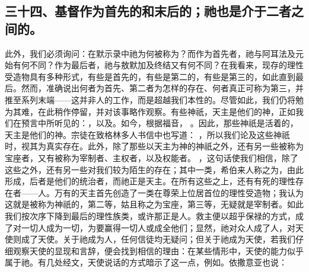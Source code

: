 
\subsection{三十四、基督作为首先的和末后的；祂也是介于二者之间的。}

此外，我们必须询问：在默示录中祂为何被称为？而作为首先者，祂与阿耳法及元始有何不同？作为最后者，祂与敖默加及终结又有何不同？在我看来，现存的理性受造物具有多种形式，有些是首先的，有些是第二的，有些是第三的，如此直到最后。然而，准确说出何者为首先、第二者为怎样的存在、何者真正可称为第三，并推至系列末端——这并非人的工作，而是超越我们本性的。尽管如此，我们仍将勉为其难，在此稍作停留，并对该事略作观察。有些神祇，天主是他们的神，正如我们在预言中所听见的：，以及。如今，根据福音， 。因此，那些神祇是活着的，天主是他们的神。宗徒在致格林多人书信中也写道： ，所以我们论及这些神祇时，视其为真实存在。此外，除了那些以天主为神的神祇之外，还有另一些被称为宝座者，又有被称为宰制者、主权者，以及权能者。 ，这句话使我们相信，除了这些之外，还有另一些对我们较为陌生的存在；其中一类，希伯来人称之为，由此形成，后者是他们的统治者，而祂正是天主。在所有这些之上，还有有死的理性存在者——人。万有的天主首先创造了一类在尊荣上位居首位的理性受造物；我认为这就是被称为神祇的，第二等，姑且称之为宝座，第三等，无疑就是宰制者。如此我们按次序下降到最后的理性族类，或许那正是人。救主便以超乎保禄的方式，成了对一切人成为一切，为要赢得一切人或成全他们；显然，祂对众人成了人，对天使则成了天使。关于祂成为人，任何信徒均无疑问；但关于祂成为天使，若我们仔细观察天使的显现和言辞，便会找到相信的理由：在某些情形中，天使的能力似乎属于祂。有几处经文，天使说话的方式暗示了这一点，例如。依撒意亚也说： 